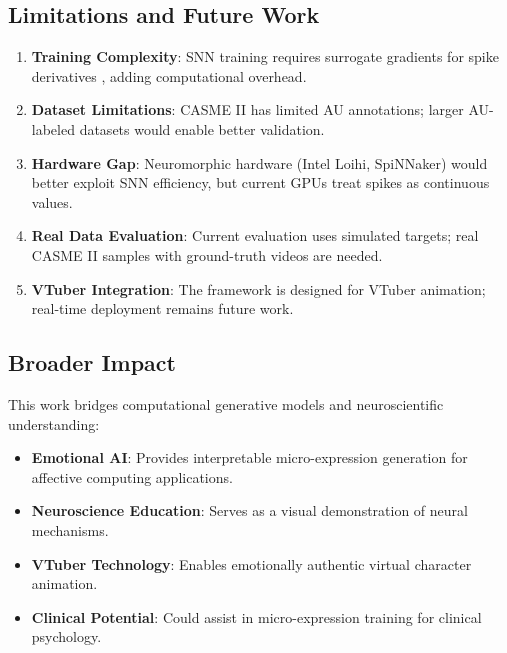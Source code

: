 \subsection{Limitations and Future Work}

\begin{enumerate}
\item \textbf{Training Complexity}: SNN training requires surrogate gradients for spike derivatives \cite{neftci2019}, adding computational overhead.

\item \textbf{Dataset Limitations}: CASME II has limited AU annotations; larger AU-labeled datasets would enable better validation.

\item \textbf{Hardware Gap}: Neuromorphic hardware (Intel Loihi, SpiNNaker) would better exploit SNN efficiency, but current GPUs treat spikes as continuous values.

\item \textbf{Real Data Evaluation}: Current evaluation uses simulated targets; real CASME II samples with ground-truth videos are needed.

\item \textbf{VTuber Integration}: The framework is designed for VTuber animation; real-time deployment remains future work.
\end{enumerate}

\subsection{Broader Impact}

This work bridges computational generative models and neuroscientific understanding:

\begin{itemize}
\item \textbf{Emotional AI}: Provides interpretable micro-expression generation for affective computing applications.
\item \textbf{Neuroscience Education}: Serves as a visual demonstration of neural mechanisms.
\item \textbf{VTuber Technology}: Enables emotionally authentic virtual character animation.
\item \textbf{Clinical Potential}: Could assist in micro-expression training for clinical psychology.
\end{itemize}